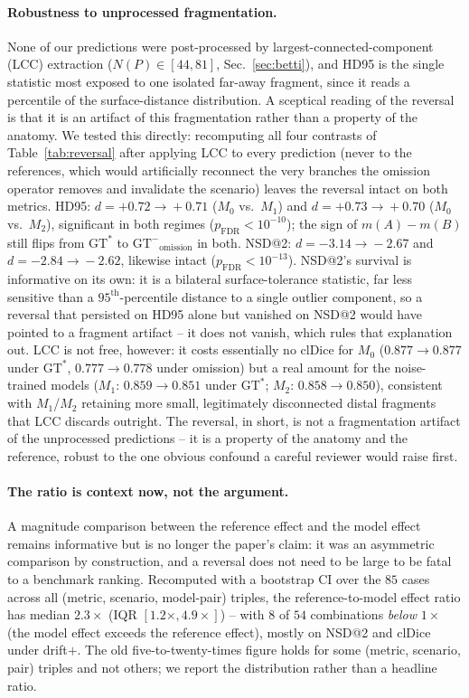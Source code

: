 \documentclass[
    bookmarks, bookmarksnumbered, bookmarksopen,
    colorlinks=true, citecolor=blue, linkcolor=blue, urlcolor=blue
]{techrep}
\newcommand{\gtstar}{\ensuremath{\mathrm{GT}^{\!*}}}
\newcommand{\gtminus}{\ensuremath{\mathrm{GT}^{\!-}}}
\begin{document}
\paragraph{Robustness to unprocessed fragmentation.} None of our predictions were post-processed
by largest-connected-component (LCC) extraction ($N(P)\in[44,81]$, Sec.~\ref{sec:betti}), and HD95
is the single statistic most exposed to one isolated far-away fragment, since it reads a
percentile of the surface-distance distribution. A sceptical reading of the reversal is that it is
an artifact of this fragmentation rather than a property of the anatomy. We tested this directly:
recomputing all four contrasts of Table~\ref{tab:reversal} after applying LCC to every
prediction (never to the references, which would artificially reconnect the very branches the
omission operator removes and invalidate the scenario) leaves the reversal intact on both metrics.
HD95: $d{=}{+}0.72\!\to\!{+}0.71$ ($M_0$ vs.\ $M_1$) and $d{=}{+}0.73\!\to\!{+}0.70$ ($M_0$ vs.\
$M_2$), significant in both regimes ($p_{\text{FDR}}{<}10^{-10}$); the sign of $m(A)-m(B)$ still
flips from $\gtstar$ to $\gtminus_{\text{omission}}$ in both. NSD@2: $d{=}{-}3.14\!\to\!{-}2.67$ and
$d{=}{-}2.84\!\to\!{-}2.62$, likewise intact ($p_{\text{FDR}}{<}10^{-13}$). NSD@2's survival is
informative on its own: it is a bilateral surface-tolerance statistic, far less sensitive than a
$95^{\text{th}}$-percentile distance to a single outlier component, so a reversal that persisted on
HD95 alone but vanished on NSD@2 would have pointed to a fragment artifact -- it does not vanish,
which rules that explanation out. LCC is not free, however: it costs essentially no clDice for
$M_0$ ($0.877\!\to\!0.877$ under $\gtstar$, $0.777\!\to\!0.778$ under omission) but a real amount
for the noise-trained models ($M_1$: $0.859\!\to\!0.851$ under $\gtstar$; $M_2$:
$0.858\!\to\!0.850$), consistent with $M_1$/$M_2$ retaining more small, legitimately disconnected
distal fragments that LCC discards outright. The reversal, in short, is not a fragmentation
artifact of the unprocessed predictions -- it is a property of the anatomy and the reference,
robust to the one obvious confound a careful reviewer would raise first.

\paragraph{The ratio is context now, not the argument.} A magnitude comparison between the
reference effect and the model effect remains informative but is no longer the paper's claim: it
was an asymmetric comparison by construction, and a reversal does not need to be large to be fatal
to a benchmark ranking. Recomputed with a bootstrap CI over the $85$ cases across all
(metric, scenario, model-pair) triples, the reference-to-model effect ratio has median $2.3\times$
(IQR $[1.2\times,4.9\times]$) -- with $8$ of $54$ combinations \emph{below} $1\times$ (the model
effect exceeds the reference effect), mostly on NSD@2 and clDice under drift$+$. The old
five-to-twenty-times figure holds for some (metric, scenario, pair) triples and not others; we
report the distribution rather than a headline ratio.
\end{document}
